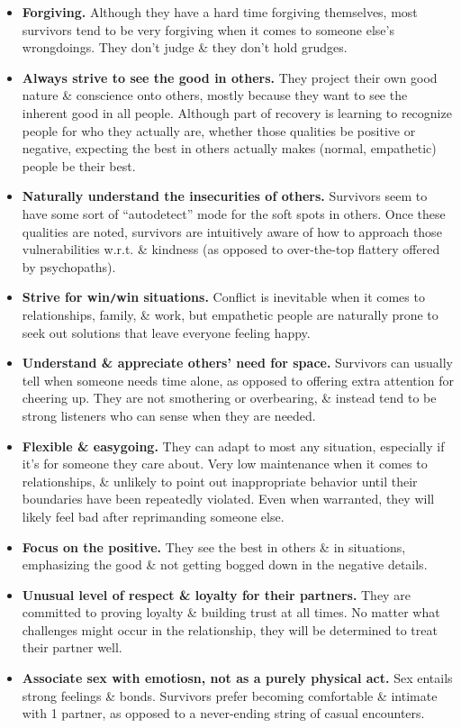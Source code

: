 \documentclass{article}
\numberwithin{equation}{section}
\begin{document}
\begin{itemize}
	\item \textbf{Forgiving.} Although they have a hard time forgiving themselves, most survivors tend to be very forgiving when it comes to someone else's wrongdoings. They don't judge \& they don't hold grudges.
	\item \textbf{Always strive to see the good in others.} They project their own good nature \& conscience onto others, mostly because they want to see the inherent good in all people. Although part of recovery is learning to recognize people for who they actually are, whether those qualities be positive or negative, expecting the best in others actually makes (normal, empathetic) people be their best.
	\item \textbf{Naturally understand the insecurities of others.} Survivors seem to have some sort of ``autodetect'' mode for the soft spots in others. Once these qualities are noted, survivors are intuitively aware of how to approach those vulnerabilities w.r.t. \& kindness (as opposed to over-the-top flattery offered by psychopaths).
	\item \textbf{Strive for win{\tt/}win situations.} Conflict is inevitable when it comes to relationships, family, \& work, but empathetic people are naturally prone to seek out solutions that leave everyone feeling happy.
	\item \textbf{Understand \& appreciate others' need for space.} Survivors can usually tell when someone needs time alone, as opposed to offering extra attention for cheering up. They are not smothering or overbearing, \& instead tend to be strong listeners who can sense when they are needed.
	\item \textbf{Flexible \& easygoing.} They can adapt to most any situation, especially if it's for someone they care about. Very low maintenance when it comes to relationships, \& unlikely to point out inappropriate behavior until their boundaries have been repeatedly violated. Even when warranted, they will likely feel bad after reprimanding someone else.
	\item \textbf{Focus on the positive.} They see the best in others \& in situations, emphasizing the good \& not getting bogged down in the negative details.
	\item \textbf{Unusual level of respect \& loyalty for their partners.} They are committed to proving loyalty \& building trust at all times. No matter what challenges might occur in the relationship, they will be determined to treat their partner well.
	\item \textbf{Associate sex with emotiosn, not as a purely physical act.} Sex entails strong feelings \& bonds. Survivors prefer becoming comfortable \& intimate with 1 partner, as opposed to a never-ending string of casual encounters.

\end{itemize}
\end{document}
